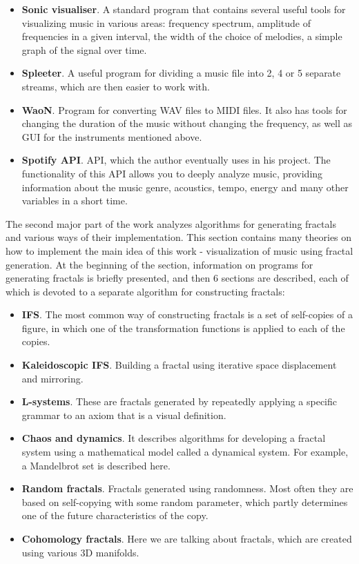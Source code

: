\documentclass[thesis=B,english]{FITthesis}[2019/12/23]
\begin{document}
\begin{itemize}
    \item \textbf{Sonic visualiser}. A standard program that contains several useful tools for visualizing music in various areas: frequency spectrum, amplitude of frequencies in a given interval, the width of the choice of melodies, a simple graph of the signal over time.
    \item \textbf{Spleeter}. A useful program for dividing a music file into 2, 4 or 5 separate streams, which are then easier to work with.
    \item \textbf{WaoN}. Program for converting WAV files to MIDI files. It also has tools for changing the duration of the music without changing the frequency, as well as GUI for the instruments mentioned above.
    \item \textbf{Spotify API}. API, which the author eventually uses in his project. The functionality of this API allows you to deeply analyze music, providing information about the music genre, acoustics, tempo, energy and many other variables in a short time.
\end{itemize}

The second major part of the work analyzes algorithms for generating fractals and various ways of their implementation. This section contains many theories on how to implement the main idea of this work - visualization of music using fractal generation. At the beginning of the section, information on programs for generating fractals is briefly presented, and then 6 sections are described, each of which is devoted to a separate algorithm for constructing fractals:

\begin{itemize}
    \item \textbf{IFS}. The most common way of constructing fractals is a set of self-copies of a figure, in which one of the transformation functions is applied to each of the copies.
    \item \textbf{Kaleidoscopic IFS}. Building a fractal using iterative space displacement and mirroring.
    \item \textbf{L-systems}. These are fractals generated by repeatedly applying a specific grammar to an axiom that is a visual definition.
    \item \textbf{Chaos and dynamics}. It describes algorithms for developing a fractal system using a mathematical model called a dynamical system. For example, a Mandelbrot set is described here.
    \item \textbf{Random fractals}. Fractals generated using randomness. Most often they are based on self-copying with some random parameter, which partly determines one of the future characteristics of the copy.
    \item \textbf{Cohomology fractals}. Here we are talking about fractals, which are created using various 3D manifolds.
\end{itemize}
\end{document}
